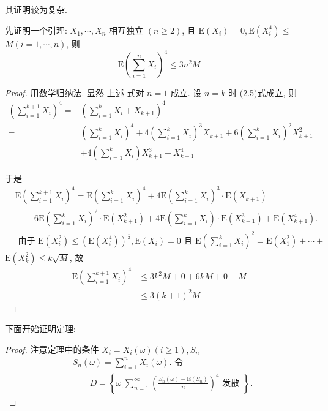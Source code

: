 其证明较为复杂. 

{
    \small
    先证明一个引理: 
         $X_1, \cdots, X_n$ 相互独立 $(n \geqslant 2)$, 且 $\mathrm{E}\left(X_i\right)=0, \mathrm{E}\left(X_i^4\right) \leqslant$ $M(i=1, \cdots, n)$, 则
$$
\mathrm{E}\left(\sum_{i=1}^n X_i\right)^4 \leqslant 3 n^2 M
$$
\begin{proof}
     用数学归纳法. 显然 上述 式对 $n=1$ 成立. 设 $n=k$ 时 (2.5)式成立, 则
$$
\begin{aligned}
\left(\sum_{i=1}^{k+1} X_i\right)^4= & \left(\sum_{i=1}^k X_i+X_{k+1}\right)^4 \\
= & \left(\sum_{i=1}^k X_i\right)^4+4\left(\sum_{i=1}^k X_i\right)^3 X_{k+1}+6\left(\sum_{i=1}^k X_i\right)^2 X_{k+1}^2 \\
& +4\left(\sum_{i=1}^k X_i\right) X_{k+1}^3+X_{k+1}^4
\end{aligned}
$$

于是
$$
\begin{aligned}
& \mathrm{E}\left(\sum_{i=1}^{k+1} X_i\right)^4=\mathrm{E}\left(\sum_{i=1}^k X_i\right)^4+4 \mathrm{E}\left(\sum_{i=1}^k X_i\right)^3 \cdot \mathrm{E}\left(X_{k+1}\right) \\
& \quad+6 \mathrm{E}\left(\sum_{i=1}^k X_i\right)^2 \cdot \mathrm{E}\left(X_{k+1}^2\right)+4 \mathrm{E}\left(\sum_{i=1}^k X_i\right) \cdot \mathrm{E}\left(X_{k+1}^3\right)+\mathrm{E}\left(X_{k+1}^4\right) . \\
& \text { 由于 } \mathrm{E}\left(X_i^2\right) \leqslant\left(\mathrm{E}\left(X_i^4\right)\right)^{\frac{1}{2}}, \mathrm{E}\left(X_i\right)=0 \text { 且 } \mathrm{E}\left(\sum_{i=1}^k X_i\right)^2=\mathrm{E}\left(X_1^2\right)+\cdots+
\end{aligned}
$$
$\mathrm{E}\left(X_k^2\right) \leqslant k \sqrt{M}$, 故
$$
\begin{aligned}
\mathrm{E}\left(\sum_{i=1}^{k+1} X_i\right)^4 & \leqslant 3 k^2 M+0+6 k M+0+M \\
& \leqslant 3(k+1)^2 M
\end{aligned}
$$
\end{proof}

下面开始证明定理: 
\begin{proof}
    注意定理中的条件 $X_i=X_i(\omega)(i \geqslant 1), S_n$
$$
\begin{aligned}
& S_n(\omega)=\sum_{i=1}^n X_i(\omega) \text {. 令 } \\
& \qquad D=\left\{\omega_{:} \sum_{n=1}^{\infty}\left(\frac{S_n(\omega)-\mathrm{E}\left(S_n\right)}{n}\right)^4 \text { 发散 }\right\} .
\end{aligned}
$$


\end{proof}}
